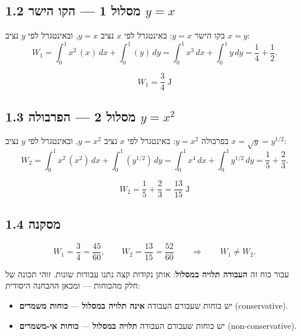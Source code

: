 \documentclass[12pt, a4paper]{article}
\begin{document}
\subsection*{1.2 מסלול 1 --- הקו הישר \textenglish{$y=x$}}

בקו הישר \textenglish{$y=x$}: באינטגרל לפי \textenglish{$x$} נציב \textenglish{$y=x$}, ובאינטגרל לפי \textenglish{$y$} נציב \textenglish{$x=y$}:
\[
  W_1 = \int_0^1 x^2\,(x)\,dx + \int_0^1 (y)\,dy
      = \int_0^1 x^3\,dx + \int_0^1 y\,dy
      = \frac{1}{4} + \frac{1}{2}.
\]
\begin{tcolorbox}[resultbox]
\[
  W_1 = \frac{3}{4}\;\text{J}
\]
\end{tcolorbox}

\subsection*{1.3 מסלול 2 --- הפרבולה \textenglish{$y=x^2$}}

בפרבולה \textenglish{$y=x^2$}: באינטגרל לפי \textenglish{$x$} נציב \textenglish{$y=x^2$}, ובאינטגרל לפי \textenglish{$y$} נציב \textenglish{$x=\sqrt{y}=y^{1/2}$}:
\[
  W_2 = \int_0^1 x^2\,(x^2)\,dx + \int_0^1 (y^{1/2})\,dy
      = \int_0^1 x^4\,dx + \int_0^1 y^{1/2}\,dy
      = \frac{1}{5} + \frac{2}{3}.
\]
\begin{tcolorbox}[resultbox]
\[
  W_2 = \frac{1}{5} + \frac{2}{3} = \frac{13}{15}\;\text{J}
\]
\end{tcolorbox}

\subsection*{1.4 מסקנה}

\[
  W_1 = \frac{3}{4} = \frac{45}{60},
  \qquad
  W_2 = \frac{13}{15} = \frac{52}{60}
  \qquad\Longrightarrow\qquad
  W_1 \ne W_2 .
\]

\begin{tcolorbox}[defbox, title={תלות במסלול}]
עבור כוח זה \textbf{העבודה תלויה במסלול}: אותן נקודות קצה נתנו עבודות שונות. זוהי תכונה של חלק מהכוחות --- ומכאן ההבחנה היסודית:
\begin{itemize}
  \item יש כוחות שעבורם העבודה \textbf{אינה תלויה במסלול} --- \textbf{כוחות משמרים} (\textenglish{conservative}).
  \item יש כוחות שעבורם העבודה \textbf{תלויה במסלול} --- \textbf{כוחות אי-משמרים} (\textenglish{non-conservative}).
\end{itemize}
\end{tcolorbox}
\end{document}

